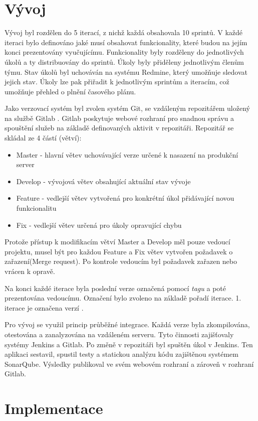 \documentclass[thesis=B,czech]{FITthesis}[2012/06/26]
\begin{document}
\section{Vývoj}
Vývoj byl rozdělen do 5 iterací, z nichž každá obsahovala 10 sprintů. V každé iteraci bylo definováno jaké musí obsahovat funkcionality,
které budou na jejím konci prezentovány vyučujícímu. Funkcionality byly rozděleny do jednotlivých úkolů a ty distribuovány do sprintů.
Úkoly byly přiděleny jednotlivým členům týmu. Stav úkolů byl uchováván na systému Redmine\cite{Redmine}, který umožňuje sledovat jejich stav.
Úkoly lze pak přiřadit k jednotlivým sprintům a iteracím, což umožňuje přehled o plnění časového plánu.
\par
Jako verzovací systém byl zvolen systém Git, se vzdáleným repozitářem uložený na službě Gitlab \cite{gitlab}. Gitlab poskytuje webové rozhraní pro snadnou správu a spouštění služeb na základě definovaných aktivit v repozitáři. Repozitář se skládal ze 4 částí (větví):
\begin{itemize}
\item Master - hlavní větev uchovávající verze určené k nasazení na produkční server
\item Develop - vývojová větev obsahující aktuální stav vývoje
\item Feature - vedlejší větev vytvořená pro konkrétní úkol přidávající novou funkcionalitu
\item Fix - vedlejší větev určená pro úkoly opravující chybu
\end{itemize}
Protože přístup k modifikacím větví Master a Develop měl pouze vedoucí projektu, musel být pro každou Feature a Fix větev
vytvořen požadavek o zařazení(Merge request). Po kontrole vedoucím byl požadavek zařazen nebo vrácen k opravě.
\par
Na konci každé iterace byla poslední verze označená pomocí \textit{tagu} a poté prezentována vedoucímu.
Označení bylo zvoleno na základě pořadí iterace. 1. iterace je označena verzí .
\par
Pro vývoj se využil princip průběžné integrace. Každá verze byla zkompilována, otestována a zanalyzována na vzdáleném serveru.
Tyto činnosti zajišťovaly systémy Jenkins\cite{jenkins} a Gitlab. Po změně v repozitáři byl spuštěn úkol v Jenkins. Ten aplikaci sestavil, spustil testy a statickou analýzu kódu 
zajištěnou systémem SonarQube\cite{sonar}. Výsledky publikoval ve svém webovém rozhraní a zároveň v rozhraní Gitlab.  
\section{Implementace}
\end{document}
